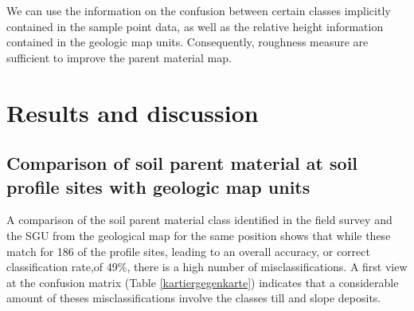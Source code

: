 \documentclass[preprint,12pt,authoryear]{elsarticle}
\begin{document}
We can use the information on the confusion between certain classes implicitly contained in the sample point data, as well as the relative height information contained in the geologic map units. Consequently, roughness measure are sufficient to improve the parent material map.

\clearpage
\section{Results and discussion}
\subsection{Comparison of soil parent material at soil profile sites with geologic map units}
A comparison of the soil parent material class identified in the field survey and the SGU from the geological map for the same position shows that while these match for 186 of the profile sites, leading to an overall accuracy, or correct classification rate,of 49\%, there is a high number of misclassifications. A first view at the confusion matrix (Table \ref{kartiergegenkarte}) indicates that a considerable amount of theses misclassifications involve the classes till  and slope deposits. 
\end{document}
